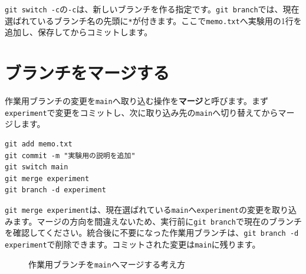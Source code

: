 \texttt{git switch -c}の\texttt{-c}は、新しいブランチを作る指定です。\texttt{git branch}では、現在選ばれているブランチ名の先頭に\texttt{*}が付きます。ここで\texttt{memo.txt}へ実験用の1行を追加し、保存してからコミットします。

\section{ブランチをマージする}

作業用ブランチの変更を\texttt{main}へ取り込む操作を\textbf{マージ}と呼びます。まず\texttt{experiment}で変更をコミットし、次に取り込み先の\texttt{main}へ切り替えてからマージします。

\begin{listing}[htbp]
\begin{verbatim}
git add memo.txt
git commit -m "実験用の説明を追加"
git switch main
git merge experiment
git branch -d experiment
\end{verbatim}
\caption{作業用ブランチを\texttt{main}へマージするコマンド}
\label{lst:appendix-git-merge}
\end{listing}

\texttt{git merge experiment}は、現在選ばれている\texttt{main}へ\texttt{experiment}の変更を取り込みます。マージの方向を間違えないため、実行前に\texttt{git branch}で現在のブランチを確認してください。統合後に不要になった作業用ブランチは、\texttt{git branch -d experiment}で削除できます。コミットされた変更は\texttt{main}に残ります。

\begin{figure}[htbp]
    \centering
    \caption{作業用ブランチを\texttt{main}へマージする考え方}
    \label{fig:appendix-git-branch-merge}
\end{figure}

